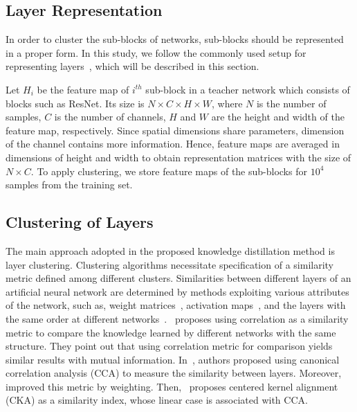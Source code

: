 \documentclass[final,3p,times]{elsarticle}
\begin{document}
\subsection{Layer Representation}
In order to cluster the sub-blocks of networks, sub-blocks should be represented in a proper form. In this study, we follow the commonly used setup for representing layers~\citep{kornblith2019similarity, raghu2017svcca,morcos2018insights}, which will be described in this section.

Let $H_i$ be the feature map of $i^{th}$ sub-block in a teacher network which consists of blocks such as ResNet. Its size is $N \times C \times H \times W$, where $N$ is the number of samples, $C$ is the number of channels, $H$ and $W$ are the height and width of the feature map, respectively. Since spatial dimensions share parameters, dimension of the channel contains more information. Hence, feature maps are averaged in dimensions of height and width to obtain representation matrices with the size of $N \times C$. 
To apply clustering, we store feature maps of the sub-blocks for $10^4$ samples from the training set. 

\subsection{Clustering of Layers}

The main approach adopted in the proposed knowledge distillation method is layer clustering. Clustering algorithms necessitate specification of a similarity metric defined among different clusters. Similarities between different layers of an artificial neural network are determined by methods exploiting various attributes of the network, such as, weight matrices~\citep{neill2020compressing}, activation maps~\citep{kornblith2019similarity, raghu2017svcca}, and the layers with the same order at different networks~\citep{li2015convergent}.~\citep{li2015convergent} proposes using correlation as a similarity metric to compare the knowledge learned by different networks with the same structure. They point out that using correlation metric for comparison yields similar results with mutual information. In~\citep{raghu2017svcca}, authors proposed using canonical correlation analysis (CCA) to measure the similarity between layers.  Moreover,~\citep{morcos2018insights} improved this metric by weighting. Then,~\citep{kornblith2019similarity} proposes centered kernel alignment (CKA) as a similarity index, whose linear case is associated with CCA.
\end{document}
